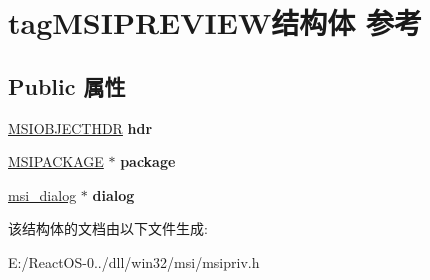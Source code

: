 \hypertarget{structtag_m_s_i_p_r_e_v_i_e_w}{}\section{tag\+M\+S\+I\+P\+R\+E\+V\+I\+E\+W结构体 参考}
\label{structtag_m_s_i_p_r_e_v_i_e_w}
\subsection*{Public 属性}
\begin{DoxyCompactItemize}
\item 
\mbox{\label{structtag_m_s_i_p_r_e_v_i_e_w_a919be0942ccf2019396ce010c0bfe01d}} 
\hyperlink{structtag_m_s_i_o_b_j_e_c_t_h_d_r}{M\+S\+I\+O\+B\+J\+E\+C\+T\+H\+DR} {\bfseries hdr}
\item 
\mbox{\label{structtag_m_s_i_p_r_e_v_i_e_w_a5607f0c4a46952701a9208547354cde6}} 
\hyperlink{structtag_m_s_i_p_a_c_k_a_g_e}{M\+S\+I\+P\+A\+C\+K\+A\+GE} $\ast$ {\bfseries package}
\item 
\mbox{\label{structtag_m_s_i_p_r_e_v_i_e_w_a6d870b807047ed7569cecdc0b96223f3}} 
\hyperlink{structmsi__dialog__tag}{msi\+\_\+dialog} $\ast$ {\bfseries dialog}
\end{DoxyCompactItemize}


该结构体的文档由以下文件生成\+:\begin{DoxyCompactItemize}
\item 
E\+:/\+React\+O\+S-\/0../dll/win32/msi/msipriv.\+h\end{DoxyCompactItemize}

